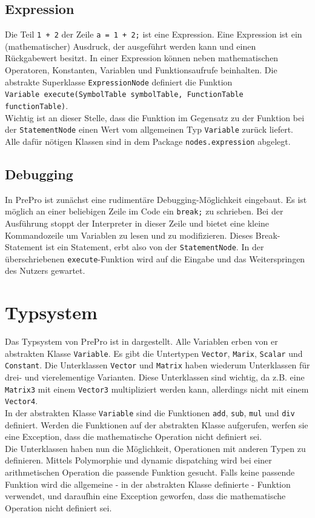\subsection{Expression}
Die Teil \texttt{1 + 2} der Zeile \texttt{a = 1 + 2;} ist eine Expression.
Eine Expression ist ein (mathematischer) Ausdruck, der ausgeführt werden kann und einen Rückgabewert besitzt.
In einer Expression können neben mathematischen Operatoren, Konstanten, Variablen und Funktionsaufrufe beinhalten.
Die abstrakte Superklasse \texttt{ExpressionNode} definiert die Funktion\\
\texttt{Variable execute(SymbolTable symbolTable, FunctionTable functionTable)}.\\
Wichtig ist an dieser Stelle, dass die Funktion im Gegensatz zu der Funktion bei der \texttt{StatementNode} einen Wert vom allgemeinen Typ \texttt{Variable} zurück liefert.
Alle dafür nötigen Klassen sind in dem Package \texttt{nodes.expression} abgelegt.

\subsection{Debugging}
In PrePro ist zunächst eine rudimentäre Debugging-Möglichkeit eingebaut.
Es ist möglich an einer beliebigen Zeile im Code ein \texttt{break;} zu schrieben.
Bei der Ausführung stoppt der Interpreter in dieser Zeile und bietet eine kleine Kommandozeile um Variablen zu lesen und zu modifizieren.
Dieses Break-Statement ist ein Statement, erbt also von der \texttt{StatementNode}.
In der überschriebenen \texttt{execute}-Funktion wird auf die Eingabe und das Weiterspringen des Nutzers gewartet.

\section{Typsystem}
Das Typsystem von PrePro ist in  dargestellt.
Alle Variablen erben von er abstrakten Klasse \texttt{Variable}.
Es gibt die Untertypen \texttt{Vector}, \texttt{Marix}, \texttt{Scalar} und \texttt{Constant}.
Die Unterklassen \texttt{Vector} und \texttt{Matrix} haben wiederum Unterklassen für drei- und vierelementige Varianten.
Diese Unterklassen sind wichtig, da z.B. eine \texttt{Matrix3} mit einem \texttt{Vector3} multipliziert werden kann, allerdings nicht mit einem \texttt{Vector4}.\\
In der abstrakten Klasse \texttt{Variable} sind die Funktionen \texttt{add}, \texttt{sub}, \texttt{mul} und \texttt{div} definiert.
Werden die Funktionen auf der abstrakten Klasse aufgerufen, werfen sie eine Exception, dass die mathematische Operation nicht definiert sei.\\
Die Unterklassen haben nun die Möglichkeit, Operationen mit anderen Typen zu definieren.
Mittels Polymorphie und dynamic dispatching wird bei einer arithmetischen Operation die passende Funktion gesucht.
Falls keine passende Funktion wird die allgemeine - in der abstrakten Klasse definierte - Funktion verwendet, und daraufhin eine Exception geworfen, dass die mathematische Operation nicht definiert sei.

